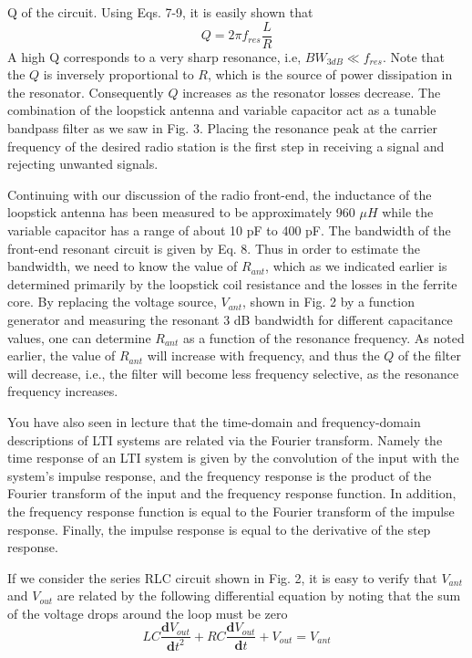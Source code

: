 \documentclass[12pt]{article}
\begin{document}
Q of the circuit. Using Eqs. 7-9, it is easily shown that
\begin{equation}
Q=2\pi f_{res}\frac{L}{R}
\end{equation}
A high Q corresponds to a very sharp resonance, i.e, $BW_{3dB}\ll f_{res}$. Note that the $Q$ is inversely
proportional to $R$, which is the source of power dissipation in the resonator. Consequently $Q$ increases as
the resonator losses decrease. The combination of the loopstick antenna and variable capacitor act as a
tunable bandpass filter as we saw in Fig. 3. Placing the resonance peak at the carrier frequency of the
desired radio station is the first step in receiving a signal and rejecting unwanted signals.
\par Continuing with our discussion of the radio front-end, the inductance of the loopstick antenna has been
measured to be approximately 960 $\mu H$ while the variable capacitor has a range of about 10 pF to 400 pF.
The bandwidth of the front-end resonant circuit is given by Eq. 8. Thus in order to estimate the
bandwidth, we need to know the value of $R_{ant}$, which as we indicated earlier is determined primarily by the
loopstick coil resistance and the losses in the ferrite core. By replacing the voltage source, $V_{ant}$, shown in Fig.
2 by a function generator and measuring the resonant 3 dB bandwidth for different capacitance values,
one can determine $R_{ant}$ as a function of the resonance frequency. As noted earlier, the value of $R_{ant}$ will
increase with frequency, and thus the $Q$ of the filter will decrease, i.e., the filter will become less frequency
selective, as the resonance frequency increases.
\par You have also seen in lecture that the time-domain and frequency-domain descriptions of LTI systems are
related via the Fourier transform. Namely the time response of an LTI system is given by the convolution
of the input with the system’s impulse response, and the frequency response is the product of the Fourier
transform of the input and the frequency response function. In addition, the frequency response function
is equal to the Fourier transform of the impulse response. Finally, the impulse response is equal to the
derivative of the step response.
\par If we consider the series RLC circuit shown in Fig. 2, it is easy to verify that $V_{ant}$ and $V_{out}$ are related
by the following differential equation by noting that the sum of the voltage drops around the loop must be
zero
\begin{equation}
LC\frac{\mathbf{d}V_{out}}{\mathbf{d}t^2}+RC\frac{\mathbf{d}V_{out}}{\mathbf{d}t}+V_{out}=V_{ant}
\end{equation}
\end{document}
